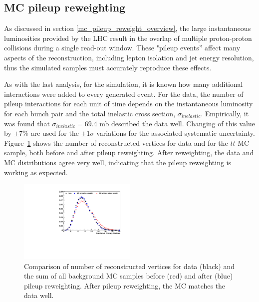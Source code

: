 \subsection{MC pileup reweighting}
\label{mc_pileup_reweight_II_overview}

\par As discussed in section \ref{mc_pileup_reweight_overview}, the
large instantaneous luminosities provided by the LHC result in the
overlap of multiple proton-proton collisions during a single read-out
window.  These "pileup events'' affect many aspects of the
reconstruction, including lepton isolation and jet energy resolution,
thus the simulated samples must accurately reproduce these effects.

\par As with the last analysis, for the simulation, it is known how many
additional interactions were added to every generated event.  For the
data, the number of pileup interactions for each unit of time depends
on the instantaneous luminosity for each bunch pair and the total
inelastic cross section, \(\sigma_{inelastic}\).  Empirically, it was
found that \(\sigma_{inelastic} = 69.4\) mb described the data well.
Changing of this value by \(\pm 7\%\) are used for the $\pm1\sigma$
variations for the associated systematic uncertainty.
Figure~\ref{fig:PUrewgt} shows the number of reconstructed vertices
for data and for the $t\bar{t}$ MC sample, both before and after
pileup reweighting.  After reweighting, the data and MC distributions
agree very well, indicating that the pileup reweighting is working as
expected. 


\begin{figure}[hbtp]
 \begin{center}
   \includegraphics[width=0.5\textwidth]{Figures/Analysis_2_Diagrams/pileUpReWeighting_4Jincl2Tincl.pdf}
   \caption{Comparison of number of reconstructed vertices for data
     (black) and the sum of all background MC samples before (red) and after (blue) pileup
     reweighting.  After pileup reweighting, the MC matches the data well.}
   \label{fig:PUrewgt}
 \end{center}
\end{figure}


